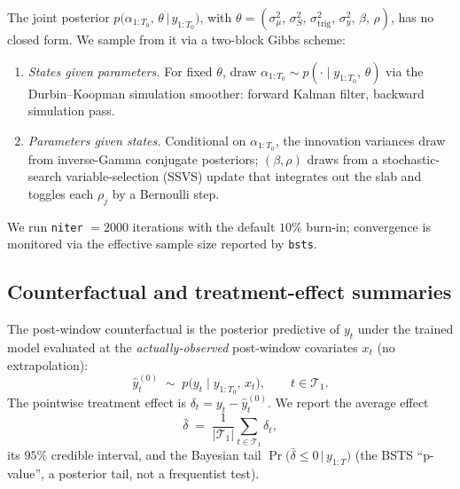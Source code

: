 \documentclass[11pt,a4paper]{article}
\begin{document}
\noindent The joint posterior $p\!\bigl(\alpha_{1:T_0},\, \theta \,\big|\, y_{1:T_0}\bigr)$, with $\theta = (\sigma_\mu^2,\, \sigma_S^2,\, \sigma_{\text{trig}}^2,\, \sigma_y^2,\, \beta,\, \rho)$, has no closed form. We sample from it via a two-block Gibbs scheme:
\begin{enumerate}\setlength{\itemsep}{2pt}\setlength{\topsep}{2pt}
\item[\textbf{(a)}] \emph{States given parameters.} For fixed $\theta$, draw $\alpha_{1:T_0} \sim p(\cdot \mid y_{1:T_0},\, \theta)$ via the Durbin--Koopman simulation smoother: forward Kalman filter, backward simulation pass.
\item[\textbf{(b)}] \emph{Parameters given states.} Conditional on $\alpha_{1:T_0}$, the innovation variances draw from inverse-Gamma conjugate posteriors; $(\beta,\rho)$ draws from a stochastic-search variable-selection (SSVS) update that integrates out the slab and toggles each $\rho_j$ by a Bernoulli step.
\end{enumerate}
We run \texttt{niter} $= 2000$ iterations with the default $10\%$ burn-in; convergence is monitored via the effective sample size reported by \texttt{bsts}.

\subsection*{Counterfactual and treatment-effect summaries}

\noindent The post-window counterfactual is the posterior predictive of $y_t$ under the trained model evaluated at the \emph{actually-observed} post-window covariates $x_t$ (no extrapolation):
\[
\hat y_t^{(0)} \;\sim\; p\!\bigl(y_t \mid y_{1:T_0},\, x_t\bigr), \qquad t \in \mathcal{T}_1.
\]
The pointwise treatment effect is $\delta_t = y_t - \hat y_t^{(0)}$. We report the average effect
\[
\bar\delta \;=\; \frac{1}{|\mathcal{T}_1|}\!\sum_{t \in \mathcal{T}_1}\! \delta_t,
\]
its $95\%$ credible interval, and the Bayesian tail $\Pr\!\bigl(\bar\delta \le 0 \,\big|\, y_{1:T}\bigr)$ (the BSTS ``p-value'', a posterior tail, not a frequentist test).
\end{document}
